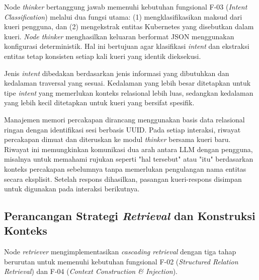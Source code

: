 Node \textit{thinker} bertanggung jawab memenuhi kebutuhan fungsional F-03
(\textit{Intent Classification}) melalui dua fungsi utama: (1) mengklasifikasikan maksud
dari kueri pengguna, dan
(2) mengekstrak entitas Kubernetes yang disebutkan dalam kueri.
\textit{Node thinker} menghasilkan keluaran berformat JSON menggunakan konfigurasi deterministik. 
Hal ini bertujuan agar klasifikasi \textit{intent} dan ekstraksi entitas tetap konsisten setiap kali 
kueri yang identik dieksekusi.

Jenis \textit{intent} dibedakan berdasarkan jenis informasi yang dibutuhkan dan kedalaman traversal yang sesuai.
Kedalaman yang lebih besar ditetapkan untuk tipe \textit{intent} yang memerlukan konteks
relasional lebih luas, sedangkan kedalaman yang lebih kecil ditetapkan untuk kueri yang
bersifat spesifik.

Manajemen memori percakapan dirancang menggunakan basis data relasional ringan dengan
identifikasi sesi berbasis UUID. Pada setiap interaksi, riwayat percakapan dimuat dan
diteruskan ke modul \textit{thinker} bersama kueri baru.
Riwayat ini memungkinkan komunikasi dua arah antara LLM dengan pengguna, misalnya untuk memahami rujukan seperti "hal tersebut" atau "itu" berdasarkan konteks percakapan
sebelumnya tanpa memerlukan pengulangan nama entitas secara eksplisit.
Setelah respons dihasilkan, pasangan kueri-respons disimpan untuk digunakan pada
interaksi berikutnya.

\subsection{Perancangan Strategi \textit{Retrieval} dan Konstruksi Konteks}
\label{subsec:retrieval-bertingkat}

Node \textit{retriever} mengimplementasikan \textit{cascading retrieval} dengan tiga tahap
berurutan untuk memenuhi kebutuhan fungsional F-02 (\textit{Structured Relation Retrieval})
dan F-04 (\textit{Context Construction \& Injection}).

